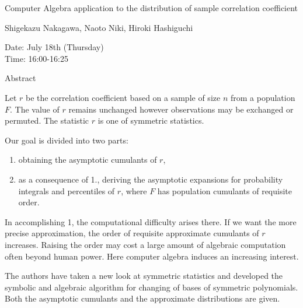 \begin{center}
\LARGE
Computer Algebra application to the distribution of sample
                     correlation coefficient

\end{center}

\begin{center}
\Large
Shigekazu Nakagawa, Naoto Niki, Hiroki Hashiguchi
\end{center}

\noindent
Date:  July 18th (Thursday)\\
Time:  16:00-16:25\\

\begin{center}
\large
Abstract
\end{center}

Let $r$ be the correlation coefficient based on a sample of size $n$ from a population $F$. The
value of $r$ remains unchanged however observations may be exchanged or permuted. The
statistic $r$ is one of symmetric statistics. 

Our goal is divided into two parts: 

\begin{enumerate}

\item
obtaining the asymptotic cumulants of $r$,
\item
as a consequence of 1., deriving the asymptotic expansions for probability integrals and
    percentiles of $r$, where $F$ has population cumulants of requisite order. 


\end{enumerate}


In accomplishing 1, the computational difficulty arises there. If we want the more precise
approximation, the order of requisite approximate cumulants of $r$ increases. Raising the order
may cost a large amount of algebraic computation often beyond human power. Here computer
algebra induces an increasing interest. 

The authors have taken a new look at symmetric statistics and developed the symbolic and
algebraic algorithm for changing of bases of symmetric polynomials. Both the asymptotic
cumulants and the approximate distributions are given. 



